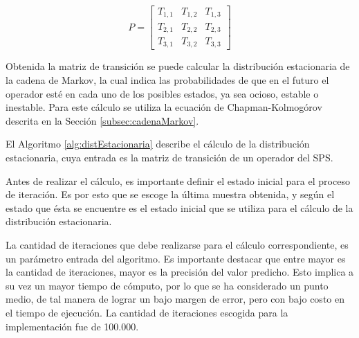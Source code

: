 \begin{equation} \label{eq:matrizTransicionPredictive}
	P =
	\begin{bmatrix}
		T_{1,1} & T_{1,2} & T_{1,3} \\
		T_{2,1} & T_{2,2} & T_{2,3} \\
		T_{3,1} & T_{3,2} & T_{3,3}
	\end{bmatrix}	
\end{equation}

Obtenida la matriz de transición se puede calcular la distribución estacionaria de la cadena de Markov, la cual indica las probabilidades de que en el futuro el operador esté en cada uno de los posibles estados, ya sea ocioso, estable o inestable. Para este cálculo se utiliza la ecuación de Chapman-Kolmogórov \citep{Papoulis1984} descrita en la Sección \ref{subsec:cadenaMarkov}.

El Algoritmo \ref{alg:distEstacionaria} describe el cálculo de la distribución estacionaria, cuya entrada es la matriz de transición de un operador del SPS. 


Antes de realizar el cálculo, es importante definir el estado inicial para el proceso de iteración. Es por esto que se escoge la última muestra obtenida, y según el estado que ésta se encuentre es el estado inicial que se utiliza para el cálculo de la distribución estacionaria.

La cantidad de iteraciones que debe realizarse para el cálculo correspondiente, es un parámetro entrada del algoritmo. Es importante destacar que entre mayor es la cantidad de iteraciones, mayor es la precisión del valor predicho. Esto implica a su vez un mayor tiempo de cómputo, por lo que se ha considerado un punto medio, de tal manera de lograr un bajo margen de error, pero con bajo costo en el tiempo de ejecución. La cantidad de iteraciones escogida para la implementación fue de 100.000.

